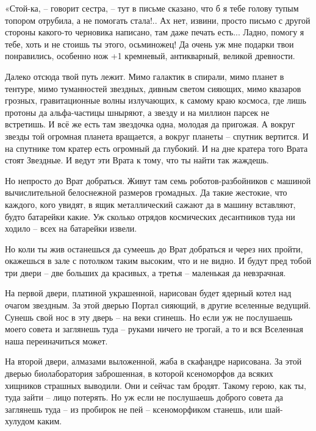 \documentclass[ebook,oneside,final,openright]{memoir}
\begin{document}
\par
«Стой-ка, – говорит сестра, – тут в письме сказано, что б я тебе голову тупым топором отрубила, а не помогать стала!.. Ах нет, извини, просто письмо с другой стороны какого-то черновика написано, там даже печать есть... Ладно, помогу я тебе, хоть и не стоишь ты этого, осьминожец! Да очень уж мне подарки твои понравились, особенно нож +1 кремневый, антикварный, великой древности.\par
\par
Далеко отсюда твой путь лежит. Мимо галактик в спирали, мимо планет в тентуре, мимо туманностей звездных, дивным светом сияющих, мимо квазаров грозных, гравитационные волны излучающих, к самому краю космоса, где лишь протоны да альфа-частицы шныряют, а звезду и на миллион парсек не встретишь. И всё же есть там звездочка одна, молодая да пригожая. А вокруг звезды той огромная планета вращается, а вокруг планеты – спутник вертится. И на спутнике том кратер есть огромный да глубокий. И на дне кратера того Врата стоят Звездные. И ведут эти Врата к тому, что ты найти так жаждешь.\par
\par
Но непросто до Врат добраться. Живут там семь роботов-разбойников с машиной вычислительной белоснежной размеров громадных. Да такие жестокие, что каждого, кого увидят, в ящик металлический сажают да в машину вставляют, будто батарейки какие. Уж сколько отрядов космических десантников туда ни ходило – всех на батарейки извели.\par
\par
Но коли ты жив останешься да сумеешь до Врат добраться и через них пройти, окажешься в зале с потолком таким высоким, что и не видно. И будут пред тобой три двери – две больших да красивых, а третья – маленькая да невзрачная.\par
\par
На первой двери, платиной украшенной, нарисован будет ядерный котел над очагом звездным. За этой дверью Портал сияющий, в другие вселенные ведущий. Сунешь свой нос в эту дверь – на веки сгинешь. Но если уж не послушаешь моего совета и заглянешь туда – руками ничего не трогай, а то и вся Вселенная наша переиначиться может.\par
\par
На второй двери, алмазами выложенной, жаба в скафандре нарисована. За этой дверью биолаборатория заброшенная, в которой ксеноморфов да всяких хищников страшных выводили. Они и сейчас там бродят. Такому герою, как ты, туда зайти – лицо потерять. Но уж если не послушаешь доброго совета да заглянешь туда – из пробирок не пей – ксеноморфиком станешь, или шай-хулудом каким.\par
\end{document}
